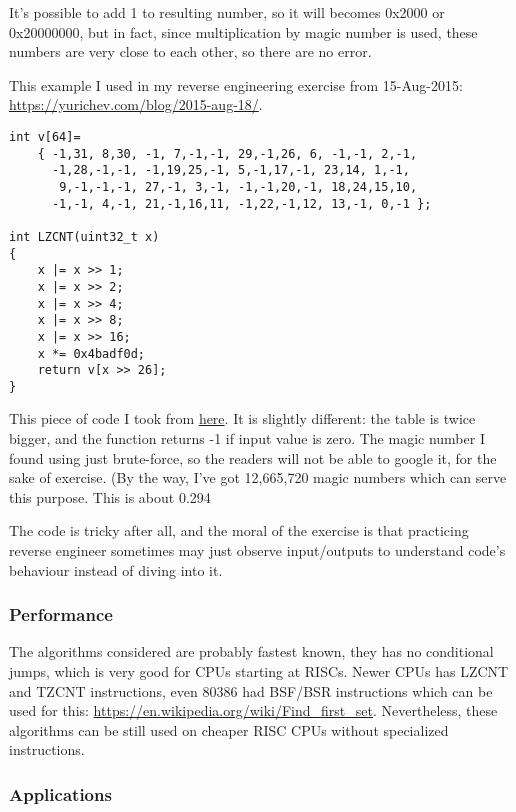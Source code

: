 It's possible to add 1 to resulting number, so it will becomes 0x2000 or 0x20000000, but in fact, since multiplication by magic number is used,
these numbers are very close to each other, so there are no error.

This example I used in my reverse engineering exercise from 15-Aug-2015: \url{https://yurichev.com/blog/2015-aug-18/}.

\begin{lstlisting}
int v[64]=
	{ -1,31, 8,30, -1, 7,-1,-1, 29,-1,26, 6, -1,-1, 2,-1,
	  -1,28,-1,-1, -1,19,25,-1, 5,-1,17,-1, 23,14, 1,-1,
	   9,-1,-1,-1, 27,-1, 3,-1, -1,-1,20,-1, 18,24,15,10,
	  -1,-1, 4,-1, 21,-1,16,11, -1,22,-1,12, 13,-1, 0,-1 };

int LZCNT(uint32_t x)
{
    x |= x >> 1;
    x |= x >> 2;
    x |= x >> 4;
    x |= x >> 8;
    x |= x >> 16;
    x *= 0x4badf0d;
    return v[x >> 26];
}
\end{lstlisting}

This piece of code I took from \href{http://stackoverflow.com/questions/7365562/de-bruijn-like-sequence-for-2n-1-how-is-it-constructed/7369288#7369288}{here}.
It is slightly different: the table is twice bigger, and the function returns -1 if input value is zero.
The magic number I found using just brute-force, so the readers will not be able to google it, for the sake of exercise.
(By the way, I've got 12,665,720 magic numbers which can serve this purpose.
This is about 0.294%

The code is tricky after all, and the moral of the exercise is that practicing reverse engineer sometimes may just observe input/outputs to understand
code's behaviour instead of diving into it.

\subsubsection{Performance}

The algorithms considered are probably fastest known, they has no conditional jumps, which is very good for CPUs starting at RISCs.
Newer CPUs has LZCNT and TZCNT instructions, even 80386 had BSF/BSR instructions which can be used for this: 
\url{https://en.wikipedia.org/wiki/Find_first_set}.
Nevertheless, these algorithms can be still used on cheaper RISC CPUs without specialized instructions.

\subsubsection{Applications}

